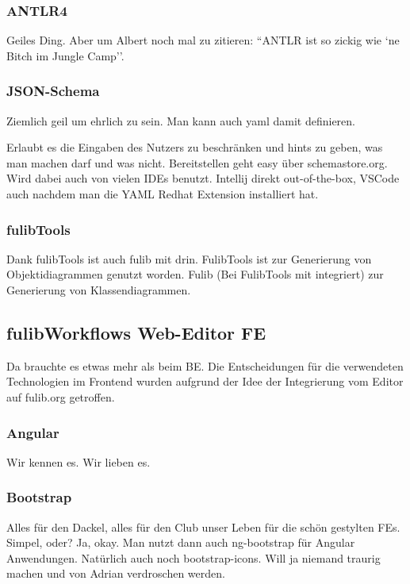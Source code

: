 \subsubsection{ANTLR4}\label{subsubsec:antlr4}
\todo
Geiles Ding.
Aber um Albert noch mal zu zitieren: ``ANTLR ist so zickig wie `ne Bitch im Jungle Camp''.

\subsubsection{JSON-Schema}\label{subsubsec:json-schema}
\todo
Ziemlich geil um ehrlich zu sein.
Man kann auch yaml damit definieren.

Erlaubt es die Eingaben des Nutzers zu beschränken und hints zu geben, was man machen darf
und was nicht.
Bereitstellen geht easy über schemastore.org.
Wird dabei auch von vielen IDEs benutzt.
Intellij direkt out-of-the-box, VSCode auch nachdem man die YAML Redhat Extension installiert hat.

\subsubsection{fulibTools}
\todo
Dank fulibTools ist auch fulib mit drin.
FulibTools ist zur Generierung von Objektidiagrammen genutzt worden.
Fulib (Bei FulibTools mit integriert) zur Generierung von Klassendiagrammen.

\subsection{fulibWorkflows Web-Editor FE}\label{subsec:fulibworkflows-web-editor}
\todo
Da brauchte es etwas mehr als beim BE\@.
Die Entscheidungen für die verwendeten Technologien im Frontend wurden aufgrund
der Idee der Integrierung vom Editor auf fulib.org getroffen.

\subsubsection{Angular}
\todo
Wir kennen es.
Wir lieben es.

\subsubsection{Bootstrap}
\todo
Alles für den Dackel, alles für den Club unser Leben für die schön gestylten FEs.
Simpel, oder?
Ja, okay.
Man nutzt dann auch ng-bootstrap für Angular Anwendungen.
Natürlich auch noch bootstrap-icons.
Will ja niemand traurig machen und von Adrian verdroschen werden.

